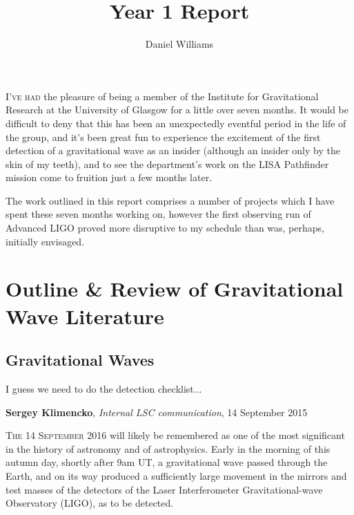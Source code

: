 \documentclass{kentigern}
\title{Year 1 Report}
\author{Daniel Williams}
\begin{document}
\maketitle

\newpage
\vfill
\lettrine{I}{'ve had} the pleasure of being a member of the Institute for
Gravitational Research at the University of Glasgow for a little over
seven months. It would be difficult to deny that this has been an
unexpectedly eventful period in the life of the group, and it's been
great fun to experience the excitement of the first detection of a
gravitational wave as an insider (although an insider only by the skin
of my teeth), and to see the department's work on the LISA Pathfinder
mission come to fruition just a few months later.  

The work outlined in this report comprises a number of projects which
I have spent these seven months working on, however the first
observing run of Advanced LIGO proved more disruptive to my schedule
than was, perhaps, initially envisaged.
\vfill
\newpage


\tableofcontents

\part{Outline \& Review of Gravitational Wave Literature}
\label{part:introduction}



\chapter{Gravitational Waves}
\label{cha:grav-waves}


\epigraph{I guess we need to do the detection checklist...}{\textbf{Sergey Klimencko}, \emph{Internal LSC communication}, 14 September 2015}

\lettrine[lines=3]{T}{he 14 September 2016} will likely be remembered as one of the most
significant in the history of astronomy and of astrophysics. Early in
the morning of this autumn day, shortly after 9am UT, a gravitational
wave passed through the Earth, and on its way produced a sufficiently
large movement in the mirrors and test masses of the detectors of the
Laser Interferometer Gravitational-wave Observatory (\gls{LIGO}), as to be
detected.
\end{document}
